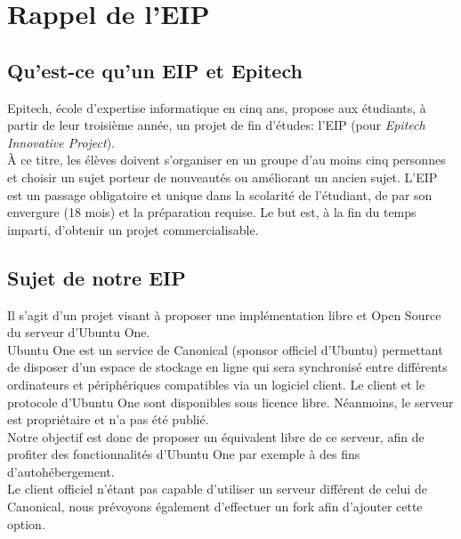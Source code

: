 \documentclass[12pt]{report}
\begin{document}
\tableofcontents
\thispagestyle{empty}

\chapter{Rappel de l'EIP}
\setcounter{page}{1} %

\section{Qu'est-ce qu'un EIP et Epitech}
Epitech, école d'expertise informatique en cinq ans, propose aux étudiants, à partir de leur troisième année, un projet de fin d'études: l'EIP (pour \emph{Epitech Innovative Project}).\\

À ce titre, les élèves doivent s'organiser en un groupe d'au moins cinq personnes et choisir un sujet porteur de nouveautés ou améliorant un ancien sujet. L'EIP est un passage obligatoire et unique dans la scolarité de l'étudiant, de par son envergure (18 mois) et la préparation requise. Le but est, à la fin du temps imparti, d'obtenir un projet commercialisable.


\section{Sujet de notre EIP}
    Il s’agit d’un projet visant à proposer une implémentation libre et Open Source du serveur d’Ubuntu One.\\

    Ubuntu One est un service de Canonical (sponsor officiel d'Ubuntu) permettant de disposer d’un espace de stockage en ligne qui sera synchronisé entre différents ordinateurs et périphériques compatibles via un logiciel client. Le client et le protocole d’Ubuntu One sont disponibles sous licence libre. Néanmoins, le serveur est propriétaire et n’a pas été publié.\\


    Notre objectif est donc de proposer un équivalent libre de ce serveur, afin
    de profiter des fonctionnalités d’Ubuntu One par exemple à des fins d’autohébergement.\\

    Le client officiel n’étant pas capable d’utiliser un serveur différent de celui
    de Canonical, nous prévoyons également d'effectuer un fork afin d'ajouter cette option.

\thispagestyle{EIP} %








\end{document}
